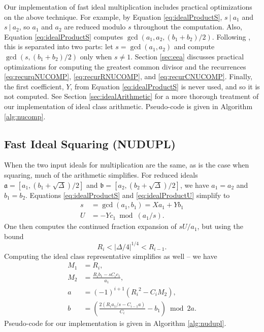 \documentclass{ucalgthes1}
\theoremstyle{definition}
\begin{document}
Our implementation of fast ideal multiplication includes practical optimizations on the above technique.  For example, by Equation \ref{eq:idealProductS}, $s ~|~ a_1$ and $s ~|~ a_2$, so $a_1$ and $a_2$ are reduced modulo $s$ throughout the computation.  Also, Equation \ref{eq:idealProductS} computes \mbox{$\gcd(a_1, a_2, (b_1 + b_2)/2)$}. Following \cite[Algorithm~6]{Imbert2010}, this is separated into two parts: let $s = \gcd(a_1, a_2)$ and compute $\gcd(s, (b_1 + b_2)/2)$ only when $s \neq 1$.  Section \ref{sec:eea} discusses practical optimizations for computing the greatest common divisor and the recurrences \ref{eq:recurqNUCOMP}, \ref{eq:recurRNUCOMP}, and \ref{eq:recurCNUCOMP}.  Finally, the first coefficient, $Y$, from Equation \ref{eq:idealProductS} is never used, and so it is not computed.  See Section \ref{sec:idealArithmetic} for a more thorough treatment of our implementation of ideal class arithmetic.  Pseudo-code is given in Algorithm \ref{alg:nucomp}.


\subsection{Fast Ideal Squaring (NUDUPL)}
\label{subsec:nudupl}

When the two input ideals for multiplication are the same, as is the case when squaring, much of the arithmetic simplifies.  For reduced ideals $\mathfrak a = [a_1, (b_1 + \sqrt\Delta)/2]$ and \mbox{$\mathfrak b = [a_2, (b_2 + \sqrt\Delta)/2]$}, we have $a_1=a_2$ and $b_1=b_2$.  Equations \ref{eq:idealProductS} and \ref{eq:idealProductU} simplify to
\begin{align*}
	s &= \gcd(a_1, b_1) = Xa_1 + Yb_1 \\
	U &= -Yc_1 \bmod (a_1/s).
\end{align*}
One then computes the continued fraction expansion of $sU/a_1$, but using the bound
\[
	R_i < |\Delta/4|^{1/4} < R_{i-1}.
\]
Computing the ideal class representative simplifies as well -- we have
\begin{align*}
	M_1 &= R_i, \\
	M_2 &= \frac{R_i b_1 - sC_i c_1}{a_1}, \\
	a &= (-1)^{i+1}({R_i}^2 - C_i M_2), \\
	b &= \left(\frac{2(R_i a_1/s  - C_{i-1} a)}{C_i} - b_1 \right) \bmod{2a}.
\end{align*}
Pseudo-code for our implementation is given in Algorithm \ref{alg:nudupl}.
\end{document}
